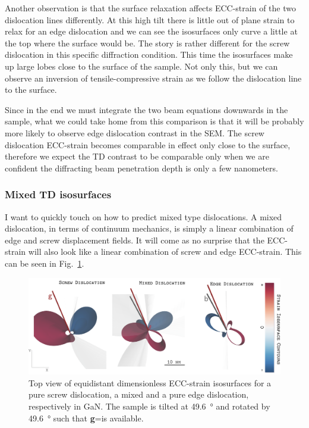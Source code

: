Another observation is that the surface relaxation affects ECC-strain of the two dislocation lines differently. At this high tilt there is little out of plane strain to relax for an edge dislocation and we can see the isosurfaces only curve a little at the top where the surface would be. The story is rather different for the screw dislocation in this specific diffraction condition. This time the isosurfaces make up large lobes close to the surface of the sample. Not only this, but we can observe an inversion of tensile-compressive strain as we follow the dislocation line to the surface. 

Since in the end we must integrate the two beam equations downwards in the sample, what we could take home from this comparison is that it will be probably more likely to observe edge dislocation contrast in the SEM. The screw dislocation ECC-strain becomes comparable in effect only close to the surface, therefore we expect the TD contrast to be comparable only when we are confident the diffracting beam penetration depth is only a few nanometers. 

\subsubsection{Mixed TD isosurfaces}

I want to quickly touch on how to predict mixed type dislocations. A mixed dislocation, in terms of continuum mechanics, is simply a linear combination of edge and screw displacement fields. It will come as no surprise that the ECC-strain will also look like a linear combination  of screw  and edge ECC-strain. This can be seen in Fig.~\ref{fig:mixed}.



\begin{figure}[ht]
    \centering
    \includegraphics[width=1\linewidth]{Figures/GaNTDtop.png}
    \caption[Mixed TD ECC-strain.]{Top view of equidistant dimensionless ECC-strain isosurfaces for a pure screw dislocation, a mixed and a pure edge dislocation, respectively in GaN. The sample is tilted at \SI{49.6}{\degree} and rotated by \SI{49.6}{\degree} such that \textbf{g}=\hkl[75-3] is available.}
    \label{fig:mixed}
\end{figure}


